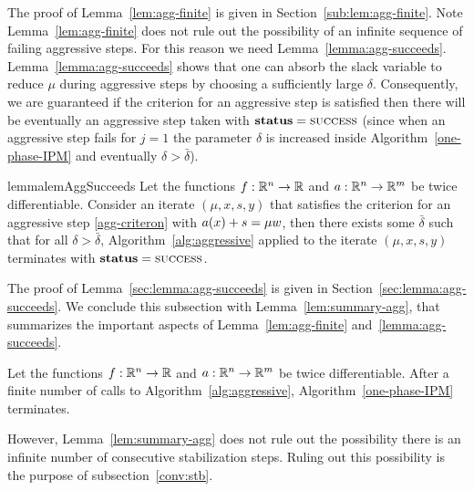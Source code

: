 \documentclass{article}
\begin{document}
The proof of Lemma~\ref{lem:agg-finite} is given in Section~\ref{sub:lem:agg-finite}. Note Lemma~\ref{lem:agg-finite} does not rule out the possibility of an infinite sequence of failing aggressive steps. For this reason we need Lemma~\ref{lemma:agg-succeeds}. Lemma~\ref{lemma:agg-succeeds} shows that one can absorb the slack variable to reduce $\mu$ during aggressive steps by choosing a sufficiently large $\delta$. Consequently, we are guaranteed if the criterion for an aggressive step is satisfied then there will be eventually an aggressive step taken with $\textbf{status} = \textsc{success}$ (since when an aggressive step fails for $j=1$ the parameter $\delta$ is increased inside Algorithm~\ref{one-phase-IPM} and eventually $\delta > \bar{\delta}$).

\begin{restatable}{lemma}{lemAggSucceeds}\label{lemma:agg-succeeds}
Let the functions $f : \mathbb{R}^{n} \rightarrow \mathbb{R}$ and $a : \mathbb{R}^{n} \rightarrow \mathbb{R}^{m}$ be twice differentiable. Consider an iterate $(\mu, x, s, y)$ that satisfies the criterion for an aggressive step \eqref{agg-criteron} with $a(x) + s = \mu w$, then there exists some $\bar{\delta}$ such that for all $\delta > \bar{\delta}$, Algorithm~\ref{alg:aggressive} applied to the iterate $(\mu, x, s, y)$ terminates with $\textbf{status} = \textsc{success}$.
\end{restatable}

The proof of Lemma~\ref{sec:lemma:agg-succeeds} is given in Section~\ref{sec:lemma:agg-succeeds}. We conclude this subsection with Lemma~\ref{lem:summary-agg}, that summarizes the important aspects of Lemma~\ref{lem:agg-finite} and~\ref{lemma:agg-succeeds}.

\begin{lemma}\label{lem:summary-agg}
Let the functions $f : \mathbb{R}^{n} \rightarrow \mathbb{R}$ and $a : \mathbb{R}^{n} \rightarrow \mathbb{R}^{m}$ be twice differentiable.
After a finite number of calls to Algorithm~\ref{alg:aggressive}, Algorithm~\ref{one-phase-IPM} terminates.
\end{lemma}

However, Lemma~\ref{lem:summary-agg} does not rule out the possibility there is an infinite number of consecutive stabilization steps. Ruling out this possibility is the purpose of subsection~\ref{conv:stb}.
\end{document}
